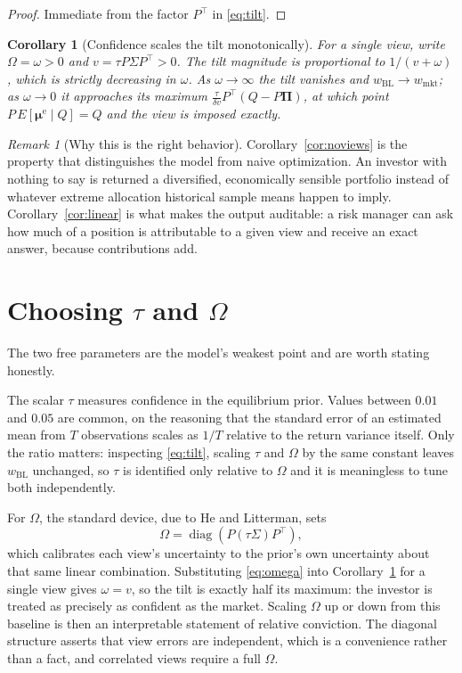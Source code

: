 \documentclass[11pt]{article}
\newtheorem{corollary}{Corollary}
\theoremstyle{remark}
\newtheorem*{remark}{Remark}
\theoremstyle{definition}
\begin{document}
\begin{proof}
Immediate from the factor $P^\top$ in \eqref{eq:tilt}.
\end{proof}

\begin{corollary}[Confidence scales the tilt monotonically]
\label{cor:confidence}
For a single view, write $\Omega = \omega > 0$ and $v = \tau P\Sigma P^\top > 0$. The tilt magnitude is proportional to $1/(v + \omega)$, which is strictly decreasing in $\omega$. As $\omega \to \infty$ the tilt vanishes and $w_{\mathrm{BL}} \to w_{\mathrm{mkt}}$; as $\omega \to 0$ it approaches its maximum $\tfrac{\tau}{\delta v}P^\top(Q - P\boldsymbol\Pi)$, at which point $P\,E[\boldsymbol\mu^{\mathrm{e}}\mid Q] = Q$ and the view is imposed exactly.
\end{corollary}

\begin{remark}[Why this is the right behavior]
\label{rem:why}
Corollary~\ref{cor:noviews} is the property that distinguishes the model from naive optimization. An investor with nothing to say is returned a diversified, economically sensible portfolio instead of whatever extreme allocation historical sample means happen to imply. Corollary~\ref{cor:linear} is what makes the output auditable: a risk manager can ask how much of a position is attributable to a given view and receive an exact answer, because contributions add.
\end{remark}

\section{Choosing $\tau$ and $\Omega$}
\label{sec:params}

The two free parameters are the model's weakest point and are worth stating honestly.

The scalar $\tau$ measures confidence in the equilibrium prior. Values between $0.01$ and $0.05$ are common, on the reasoning that the standard error of an estimated mean from $T$ observations scales as $1/T$ relative to the return variance itself. Only the ratio matters: inspecting \eqref{eq:tilt}, scaling $\tau$ and $\Omega$ by the same constant leaves $w_{\mathrm{BL}}$ unchanged, so $\tau$ is identified only relative to $\Omega$ and it is meaningless to tune both independently.

For $\Omega$, the standard device, due to He and Litterman, sets
\begin{equation}
\label{eq:omega}
\Omega = \operatorname{diag}\!\left(P(\tau\Sigma)P^\top\right),
\end{equation}
which calibrates each view's uncertainty to the prior's own uncertainty about that same linear combination. Substituting \eqref{eq:omega} into Corollary~\ref{cor:confidence} for a single view gives $\omega = v$, so the tilt is exactly half its maximum: the investor is treated as precisely as confident as the market. Scaling $\Omega$ up or down from this baseline is then an interpretable statement of relative conviction. The diagonal structure asserts that view errors are independent, which is a convenience rather than a fact, and correlated views require a full $\Omega$.
\end{document}
